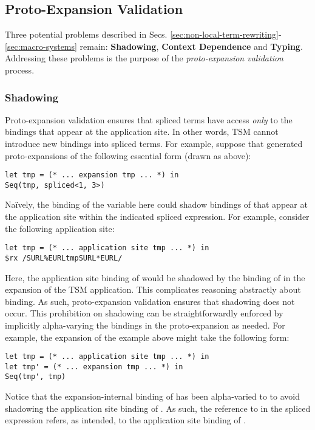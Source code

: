 \subsection{Proto-Expansion Validation}\label{sec:uetsms-validation}
Three potential problems described in Secs. \ref{sec:non-local-term-rewriting}-\ref{sec:macro-systems} remain: \textbf{Shadowing}, \textbf{Context Dependence} and \textbf{Typing}. Addressing these problems is the purpose of the \emph{proto-expansion validation} process.


\subsubsection{Shadowing}
Proto-expansion validation ensures that spliced terms have access \emph{only} to the bindings that appear at the application site. In other words, TSM cannot introduce new bindings into spliced terms. For example, suppose that   generated proto-expansions of the following essential form (drawn as above):
\begin{lstlisting}[numbers=none]
let tmp = (* ... expansion tmp ... *) in 
Seq(tmp, spliced<1, 3>)
\end{lstlisting}
Na\"ively, the binding of the variable  here could shadow bindings of  that appear at the application site within the indicated spliced expression. For example, consider the following application site:
\begin{lstlisting}[numbers=none]
let tmp = (* ... application site tmp ... *) in 
$rx /SURL%EURLtmpSURL*EURL/
\end{lstlisting}
Here, the application site binding of  would be shadowed by the binding of  in the expansion of the TSM application. This complicates reasoning abstractly about binding. As such, proto-expansion validation ensures that shadowing does not occur. This prohibition on shadowing can be straightforwardly enforced by implicitly alpha-varying the bindings in the proto-expansion as needed. For example, the expansion of the example above might take the following form:
\begin{lstlisting}[numbers=none]
let tmp = (* ... application site tmp ... *) in 
let tmp' = (* ... expansion tmp ... *) in 
Seq(tmp', tmp)
\end{lstlisting}
Notice that the expansion-internal binding of  has been alpha-varied to  to avoid shadowing the application site binding of . As such, the reference to  in the spliced expression refers, as intended, to the application site binding of .

